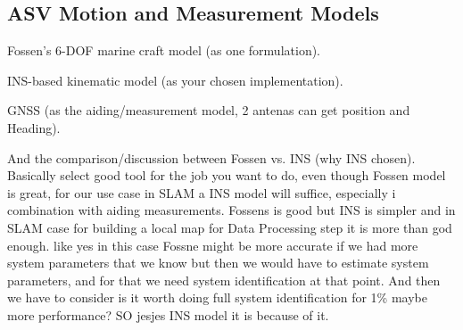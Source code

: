 \subsection{ASV Motion and Measurement Models}
Fossen’s 6-DOF marine craft model (as one formulation).

INS-based kinematic model (as your chosen implementation).

GNSS (as the aiding/measurement model, 2 antenas can get position and Heading).

And the comparison/discussion between Fossen vs. INS (why INS chosen).
Basically select good tool for the job you want to do, even though Fossen model is great, for our use case in SLAM a INS model will suffice, especially i combination with aiding measurements. Fossens is good but INS is simpler and in SLAM case for building a local map for Data Processing step it is more than god enough. like yes in this case Fossne might be more accurate if we had more system parameters that we know but then we would have to estimate system parameters, and for that we need system identification at that point. And then we have to consider is it worth doing full system identification for 1\% maybe more performance? SO jesjes INS model it is because of it.